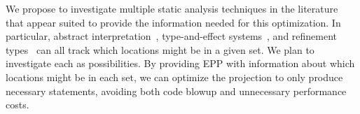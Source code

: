 We propose to investigate multiple static analysis techniques in the literature that appear suited to provide the information needed for this optimization.
In particular, abstract interpretation~, type-and-effect systems~,
and refinement types~ can all track which locations might be in a given set.
We plan to investigate each as possibilities.
By providing EPP with information about which locations might be in each set,
we can optimize the projection to only produce necessary \AmIN statements,
avoiding both code blowup and unnecessary performance costs.


